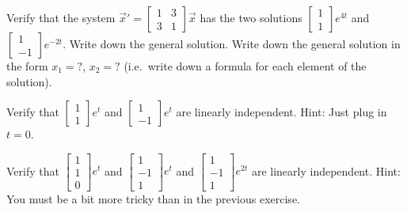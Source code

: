 \begin{exercise}
\leavevmode
\begin{tasks}
\task
Verify that the system ${\vec{x}}' =
\left[ \begin{smallmatrix}
1 & 3 \\ 3 & 1
\end{smallmatrix} \right] \vec{x}$ has the two solutions
$\left[ \begin{smallmatrix}
1 \\ 1
\end{smallmatrix} \right] e^{4t}$ and
$\left[ \begin{smallmatrix}
1 \\ -1
\end{smallmatrix} \right] e^{-2t}$.
\task
Write down the general solution.
\task
Write down the general solution in the form $x_1 = ?$, $x_2 = ?$
(i.e.\ write down a formula for each element of the solution).
\end{tasks}
\end{exercise}

\begin{exercise}
Verify that
$\left[ \begin{smallmatrix}
1 \\ 1
\end{smallmatrix} \right] e^{t}$ and
$\left[ \begin{smallmatrix}
1 \\ -1
\end{smallmatrix} \right] e^{t}$ 
are linearly independent.  Hint: Just plug in $t=0$.
\end{exercise}

\begin{exercise}
Verify that
$\left[ \begin{smallmatrix}
1 \\ 1 \\ 0
\end{smallmatrix} \right] e^{t}$ and
$\left[ \begin{smallmatrix}
1 \\ -1 \\ 1
\end{smallmatrix} \right] e^{t}$ 
and
$\left[ \begin{smallmatrix}
1 \\ -1 \\ 1
\end{smallmatrix} \right] e^{2t}$ 
are linearly independent.  Hint: You must be a bit more tricky than in the
previous exercise.
\end{exercise}

